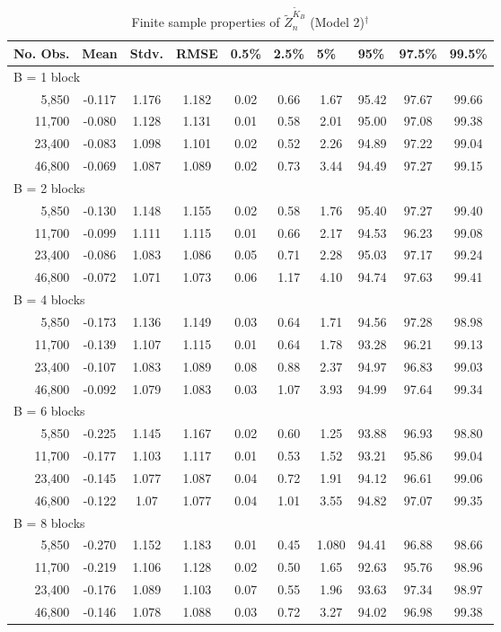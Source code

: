 \documentclass[11pt]{article}
\numberwithin{equation}{section}
\theoremstyle{plain}
\theoremstyle{remark}
\begin{document}
\begin{table}[]
\centering
\caption{Finite sample properties of $\tilde{Z}_n^{\tilde{K}_B}$ (Model 2)$^\dag$} 
\label{stdRKfeasible}
\begin{tabular}{@{}rccccccccc@{}}
\toprule
\toprule
\multicolumn{1}{l}{No. Obs.} & \multicolumn{1}{l}{Mean} & \multicolumn{1}{l}{Stdv.} & \multicolumn{1}{l}{RMSE} & \multicolumn{1}{l}{0.5\%} & \multicolumn{1}{l}{2.5\%} & \multicolumn{1}{l}{5\%} & \multicolumn{1}{l}{95\%} & \multicolumn{1}{l}{97.5\%} & \multicolumn{1}{l}{99.5\%} \\ \toprule
\multicolumn{10}{l}{B = 1 block} \\
5,850 & -0.117&1.176&1.182&0.02&0.66&1.67&95.42&97.67&99.66
\\
11,700 & -0.080&1.128&1.131&0.01&0.58&2.01&95.00&97.08&99.38\\
23,400 & -0.083&1.098&1.101&0.02&0.52&2.26&94.89&97.22&99.04\\
46,800 &  -0.069&1.087&1.089&0.02&0.73&3.44&94.49&97.27&99.15\\
\multicolumn{10}{l}{B = 2 blocks} \\
5,850 & -0.130&1.148&1.155&0.02&0.58&1.76&95.40&97.27&99.40
\\
11,700 & -0.099&1.111&1.115&0.01&0.66&2.17&94.53&96.23&99.08\\
23,400 &  -0.086&1.083&1.086&0.05&0.71&2.28&95.03&97.17&99.24\\
46,800 & -0.072&1.071&1.073&0.06&1.17&4.10&94.74&97.63&99.41
\\
\multicolumn{10}{l}{B = 4 blocks} \\
5,850 & -0.173&1.136&1.149&0.03&0.64&1.71&94.56&97.28&98.98
\\
11,700 &-0.139&1.107&1.115&0.01&0.64&1.78&93.28&96.21&99.13\\
23,400 & -0.107&1.083&1.089&0.08&0.88&2.37&94.97&96.83&99.03\\
46,800 & -0.092&1.079&1.083&0.03&1.07&3.93&94.99&97.64&99.34
\\
\multicolumn{10}{l}{B = 6 blocks} \\
5,850 & -0.225&1.145&1.167&0.02&0.60&1.25&93.88&96.93&98.80
\\
11,700 & -0.177&1.103&1.117&0.01&0.53&1.52&93.21&95.86&99.04
\\
23,400 & -0.145&1.077&1.087&0.04&0.72&1.91&94.12&96.61&99.06\\
46,800 &-0.122&1.07&1.077&0.04&1.01&3.55&94.82&97.07&99.35
\\
\multicolumn{10}{l}{B = 8 blocks} \\
5,850 &-0.270&1.152&1.183&0.01&0.45&1.080&94.41&96.88&98.66
\\
11,700 & -0.219&1.106&1.128&0.02&0.50&1.65&92.63&95.76&98.96\\
23,400 &-0.176&1.089&1.103&0.07&0.55&1.96&93.63&97.34&98.97\\
46,800 &-0.146&1.078&1.088&0.03&0.72&3.27&94.02&96.98&99.38
\\
\bottomrule


\end{tabular}
\end{table}
\end{document}
